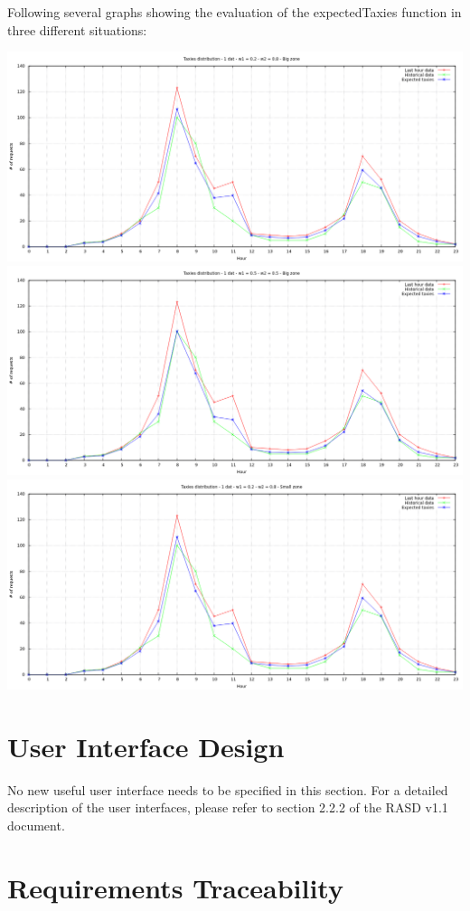 \documentclass[11pt,titlepage]{article} %
\newenvironment{changemargin}[3]{%
\begin{list}{}{%
\setlength{\topsep}{0pt}%
\setlength{\headsep}{#3}%
\setlength{\leftmargin}{#1}%
\setlength{\rightmargin}{#2}%
\setlength{\listparindent}{\parindent}%
\setlength{\itemindent}{\parindent}%
\setlength{\parsep}{\parskip}%
}%
\item[]}{\end{list}}
\begin{document}
Following several graphs showing the evaluation of the expectedTaxies function in three different situations:\newline
\begin{changemargin}{-2cm}{0cm}{0cm}
	\includegraphics[scale=0.5]{graph1.png}
	\includegraphics[scale=0.5]{graph2.png}
	\includegraphics[scale=0.5]{graph3.png}
\end{changemargin}
\newpage
\section{User Interface Design}
	No new useful user interface needs to be specified in this section.\newline
	For a detailed description of the user interfaces, please refer to section 2.2.2 of the RASD v1.1 document.

\newpage
\section{Requirements Traceability}
\end{document}
